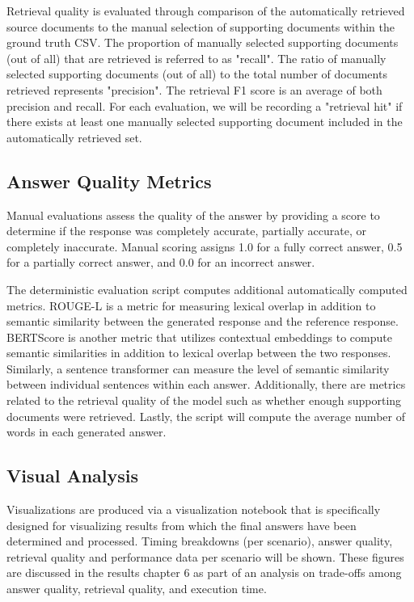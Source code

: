 Retrieval quality is evaluated through comparison of the automatically retrieved source documents to the manual selection of supporting documents within the ground truth CSV. The proportion of manually selected supporting documents (out of all) that are retrieved is referred to as "recall". The ratio of manually selected supporting documents (out of all) to the total number of documents retrieved represents "precision". The retrieval F1 score is an average of both precision and recall. For each evaluation, we will be recording a "retrieval hit" if there exists at least one manually selected supporting document included in the automatically retrieved set.

\subsection{Answer Quality Metrics}

Manual evaluations assess the quality of the answer by providing a score to determine if the response was completely accurate, partially accurate, or completely inaccurate. Manual scoring assigns 1.0 for a fully correct answer, 0.5 for a partially correct answer, and 0.0 for an incorrect answer. 

The deterministic evaluation script computes additional automatically computed metrics. \acs{ROUGE-L} is a metric for measuring lexical overlap in addition to semantic similarity between the generated response and the reference response. \acs{BERTScore} is another metric that utilizes contextual embeddings to compute semantic similarities in addition to lexical overlap between the two responses. Similarly, a sentence transformer can measure the level of semantic similarity between individual sentences within each answer. Additionally, there are metrics related to the retrieval quality of the model such as whether enough supporting documents were retrieved. Lastly, the script will compute the average number of words in each generated answer.

\subsection{Visual Analysis}

Visualizations are produced via a visualization notebook that is specifically designed for visualizing results from which the final answers have been determined and processed. Timing breakdowns (per scenario), answer quality, retrieval quality and performance data per scenario will be shown. These figures are discussed in the results chapter 6 as part of an analysis on trade-offs among answer quality, retrieval quality, and execution time.

